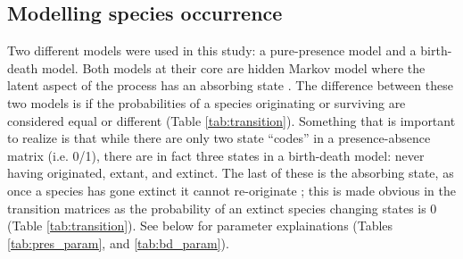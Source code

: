 \documentclass[12pt,letterpaper]{article}
\begin{document}
\subsection*{Modelling species occurrence}
Two different models were used in this study: a pure-presence model and a birth-death model. Both models at their core are hidden Markov model where the latent aspect of the process has an absorbing state \citep{Allen2011}. The difference between these two models is if the probabilities of a species originating or surviving are considered equal or different (Table \ref{tab:transition}). Something that is important to realize is that while there are only two state ``codes'' in a presence-absence matrix (i.e. 0/1), there are in fact three states in a birth-death model: never having originated, extant, and extinct. The last of these is the absorbing state, as once a species has gone extinct it cannot re-originate \citep{Allen2011}; this is made obvious in the transition matrices as the probability of an extinct species changing states is 0 (Table \ref{tab:transition}). See below for parameter explainations (Tables \ref{tab:pres_param}, and \ref{tab:bd_param}).
\end{document}
